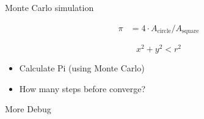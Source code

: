 \begin{frame}[fragile]


    Monte Carlo simulation

    \begin{align*}
        \pi &= 4 \cdot A_\text{circle} / A_\text{square}
    \end{align*}

    \begin{equation*}
        x^2 + y^2 < r^2
    \end{equation*}

    \begin{itemize}
        \item Calculate Pi (using Monte Carlo)
        \item How many steps before converge?
    \end{itemize}

\end{frame}


\begin{frame}[fragile]

    More Debug


\end{frame}





